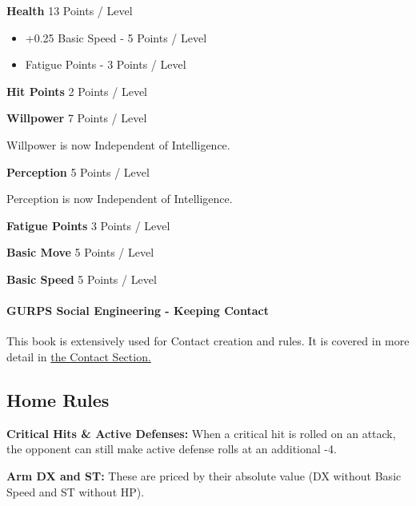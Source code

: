 \begin{multicols*}{3}
\begin{coloredbox}
	\noindent\newline\textbf{Health}
	13 Points / Level
	
	\begin{itemize}
		\itemsep 0pt
		\item +0.25 Basic Speed - 5 Points / Level
		\item Fatigue Points - 3 Points / Level
	\end{itemize}
	
	\noindent\newline\textbf{Hit Points}
	2 Points / Level
	
	\noindent\newline\textbf{Willpower }
	7 Points / Level
	
	\noindent
	Willpower is now Independent of Intelligence.
	
	\noindent\newline\textbf{Perception}
	5 Points / Level
	
	\noindent
	Perception is now Independent of Intelligence.
	
	\noindent\newline\textbf{Fatigue Points}
	3 Points / Level
	
	\noindent\newline\textbf{Basic Move}
	5 Points / Level
	
	\noindent\newline\textbf{Basic Speed}
	5 Points / Level
	
	\end{coloredbox}
	
	\paragraph{GURPS Social Engineering - Keeping Contact}
	
	This book is extensively used for Contact creation and rules. It is covered in more detail in \hyperref[Contacts]{the Contact Section.}
	
	\subsection{Home Rules}
	
	\textbf{Critical Hits \& Active Defenses:} When a critical hit is rolled on an attack, the opponent can still make active defense rolls at an additional -4.
	
	\textbf{Arm DX and ST:} These are priced by their absolute value (DX without Basic Speed and ST without HP).
	

\end{multicols*}
